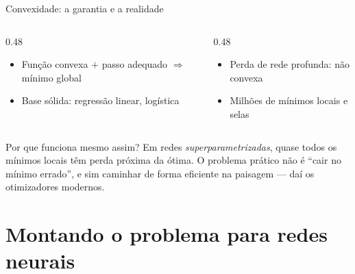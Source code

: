 \documentclass[aspectratio=169, 11pt]{beamer}
\begin{document}
\begin{frame}{Convexidade: a garantia e a realidade}
  \begin{columns}[T]
    \begin{column}{0.48\textwidth}
      \begin{tcolorbox}[iccaixa=icCiano, title={O que a teoria garante}]
        \begin{itemize}\setlength{\itemsep}{0.2ex}
          \item Função convexa $+$ passo adequado $\Rightarrow$ mínimo global
          \item Base sólida: regressão linear, logística
        \end{itemize}
      \end{tcolorbox}
    \end{column}
    \begin{column}{0.48\textwidth}
      \begin{tcolorbox}[iccaixa=icMagenta, title={O que o deep learning vive}]
        \begin{itemize}\setlength{\itemsep}{0.2ex}
          \item Perda de rede profunda: \alert{não convexa}
          \item Milhões de mínimos locais e selas
        \end{itemize}
      \end{tcolorbox}
    \end{column}
  \end{columns}

  \medskip
  \begin{ideiabox}
    Por que funciona mesmo assim? Em redes \emph{superparametrizadas}, quase
    todos os mínimos locais têm perda próxima da ótima. O problema prático não é
    ``cair no mínimo errado'', e sim caminhar de forma eficiente na paisagem —
    daí os otimizadores modernos.
  \end{ideiabox}
\end{frame}

\section{Montando o problema para redes neurais}
\end{document}
